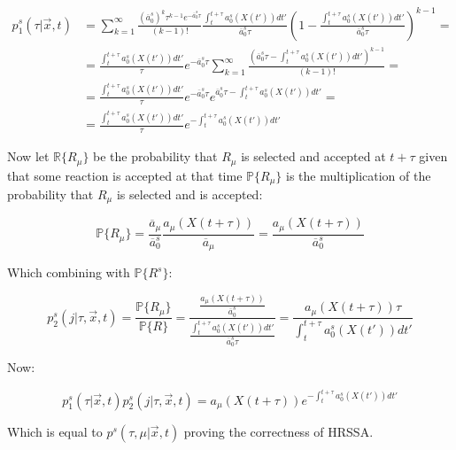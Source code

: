   \begin{align*}
    p_1^s(\tau|\vec{x},t) &=\sum\limits_{k=1}^\infty\frac{(\overline{a}_0^s)^k\tau^{k-1}e^{-\overline{a}_0^s\tau}}{(k-1)!}\frac{\int_t^{t+\tau}a_0^s(X(t'))dt'}{\overline{a}_0^s\tau}\left(1-\frac{\int_t^{t+\tau}a_0^s(X(t'))dt'}{\overline{a}_0^s\tau}\right)^{k-1} = \\
                          &=\frac{\int_t^{t+\tau}a_0^s(X(t'))dt'}{\tau}e^{-\overline{a}_0^s\tau}\sum\limits_{k=1}^{\infty}\frac{(\overline{a}_0^s\tau-\int_t^{t+\tau}a_0^s(X(t'))dt')^{k-1}}{(k-1)!} = \\
                          &=\frac{\int_t^{t+\tau}a_0^s(X(t'))dt'}{\tau}e^{-\overline{a}_0^s\tau}e^{\overline{a}_0^s\tau-\int_t^{t+\tau}a_0^s(X(t'))dt'} = \\
                          &=\frac{\int_t^{t+\tau}a_0^s(X(t'))dt'}{\tau}e^{-\int_t^{t+\tau}a_0^s(X(t'))dt'}
  \end{align*}

  Now let $\mathbb{R}\{R_\mu\}$ be the probability that $R_\mu$ is selected and accepted at $t+\tau$ given that some reaction is accepted at that time $\mathbb{P}\{R_\mu\}$ is the multiplication of the probability that $R_\mu$ is selected and is accepted:

  $$\mathbb{P}\{R_\mu\} = \frac{\overline{a}_\mu}{\overline{a}_0^s} \frac{a_\mu(X(t+\tau))}{\overline{a}_\mu} = \frac{a_\mu(X(t+\tau))}{\overline{a}_0^s}$$

  Which combining with $\mathbb{P}\{R^s\}$:

  $$p_2^s(j|\tau, \vec{x},t) = \frac{\mathbb{P}\{R_\mu\}}{\mathbb{P}\{R\}} = \frac{\frac{a_\mu(X(t+\tau))}{\overline{a}_0^s}}{\frac{\int_t^{t+\tau}a_0^s(X(t'))dt'}{\overline{a}_0^s\tau}} = \frac{a_\mu(X(t+\tau))\tau}{\int_t^{t+\tau}a_0^s(X(t'))dt'}$$

  Now:

  $$p_1^s(\tau|\vec{x},t)p_2^s(j|\tau,\vec{x},t) = a_\mu(X(t+\tau))e^{-\int_t^{t+\tau}a_0^s(X(t'))dt'}$$

  Which is equal to $p^s(\tau, \mu|\vec{x},t)$ proving the correctness of HRSSA.

